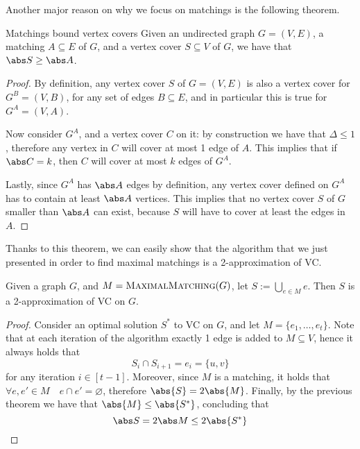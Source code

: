 \documentclass[a4paper, 12pt]{report}
\begin{document}

    Another major reason on why we focus on matchings is the following theorem.

    \begin{framedthm}{Matchings bound vertex covers}
        Given an undirected graph $G = (V, E)$, a matching $A \subseteq E$ of $G$, and a vertex cover $S \subseteq V$ of $G$, we have that $\abs S \ge \abs A$.
    \end{framedthm}

    \begin{proof}
        By definition, any vertex cover $S$ of $G = (V, E)$ is also a vertex cover for $G^B = (V, B)$, for any set of edges $B \subseteq E$, and in particular this is true for $G^A = (V, A)$.

        Now consider $G^A$, and a vertex cover $C$ on it: by construction we have that $\Delta \le 1$, therefore any vertex in $C$ will cover at most 1 edge of $A$. This implies that if $\abs C = k$, then $C$ will cover at most $k$ edges of $G^A$.

        Lastly, since $G^A$ has $\abs A$ edges by definition, any vertex cover defined on $G^A$ has to contain at least $\abs A$ vertices. This implies that no vertex cover $S$ of $G$ smaller than $\abs A$ can exist, because $S$ will have to cover at least the edges in $A$.
    \end{proof}
    
    Thanks to this theorem, we can easily show that the algorithm that we just presented in order to find maximal matchings is a 2-approximation of VC. 

    \begin{framedthm}{}
        Given a graph $G$, and $M = \textsc{MaximalMatching}(G)$, let $S := \bigcup_{e \in M}{e}$. Then $S$ is a 2-approximation of VC on $G$.
    \end{framedthm}

    \begin{proof}
        Consider an optimal solution $S^*$ to VC on $G$, and let $M = \{e_1, \ldots, e_t\}$. Note that at each iteration of the algorithm exactly 1 edge is added to $M \subseteq V$, hence it always holds that $$S_i \cap S_{i + 1} = e_i = \{u, v\}$$ for any iteration $i \in [t - 1]$. Moreover, since $M$ is a matching, it holds that $\forall e, e' \in M \quad e \cap e' = \varnothing$, therefore $\abs{S} = 2 \abs{M}$. Finally, by the previous theorem we have that $\abs{M} \le \abs{S^*}$, concluding that $$\abs S = 2 \abs M \le 2 \abs{S^*}$$
    \end{proof}
    
\end{document}
